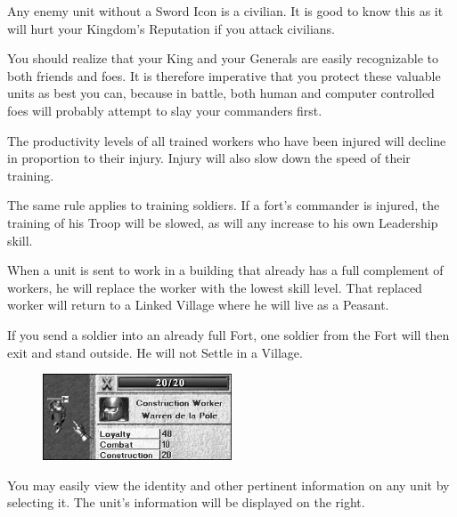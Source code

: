 Any enemy unit without a Sword Icon is a civilian. It is good to know this as it will hurt your Kingdom’s Reputation if you attack civilians.


You should realize that your King and your Generals are easily recognizable to both friends and foes. It is therefore imperative that you protect these valuable units as best you can, because in battle, both human and computer controlled foes will probably attempt to slay your commanders first.

The productivity levels of all trained workers who have been injured will decline in proportion to their injury. Injury will also slow down the speed of their training.


The same rule applies to training soldiers. If a fort’s commander is injured, the training of his Troop will be slowed, as will any increase to his own Leadership skill.

When a unit is sent to work in a building that already has a full complement of workers, he will replace the worker with the lowest skill level. That replaced worker will return to a Linked Village where he will live as a Peasant.

If you send a soldier into an already full Fort, one soldier from the Fort will then exit and stand outside. He will not Settle in a Village.

\begin{figure}
    \vspace{-20pt}
    \begin{center}
        \includegraphics[width=0.5\textwidth]{Ipeasant} %
    \end{center}
    \vspace{-20pt}
\end{figure}

You may easily view the identity and other pertinent information on any unit by selecting it. The unit’s information will be displayed on the right. \\ %

